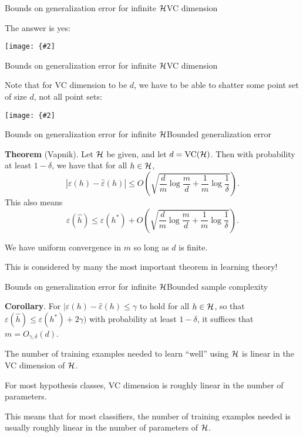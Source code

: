 \documentclass{beamer}
\newcommand{\myfig}[3]{\centerline{\texttt{[image: \{\#2]}}}
    \centerline{\scriptsize #3}}
\begin{document}
\begin{frame}{Bounds on generalization error for infinite $\cal H$}{VC dimension}

  The answer is yes:

  \medskip
  
  \myfig{4.5in}{shattering}{Ng (2017), CS229 lecture notes.}

\end{frame}


\begin{frame}{Bounds on generalization error for infinite $\cal H$}{VC dimension}

  Note that for VC dimension to be $d$, we have to be able to shatter
  \alert{some} point set of size $d$, \alert{not all} point sets:

  \medskip
 
  \myfig{3in}{unshatterable-points}{Ng (2017), CS229 lecture notes.}
  
\end{frame}


\begin{frame}{Bounds on generalization error for infinite $\cal H$}{Bounded generalization error}

  \textbf{Theorem} (Vapnik). Let $\cal H$ be given, and let $d =
  \text{VC}({\cal H})$. Then with probability at least $1-\delta$, we
  have that for all $h \in \cal H$,
  \[ |\varepsilon(h)-\hat{\varepsilon}(h)| \le O\left( \sqrt{\frac{d}{m}\log\frac{m}{d}+\frac{1}{m}\log\frac{1}{\delta}} \right) .\]
  This also means
  \[ \varepsilon(\hat{h}) \le \varepsilon(h^*) + O\left( \sqrt{\frac{d}{m}\log\frac{m}{d}+\frac{1}{m}\log\frac{1}{\delta}} \right) .\]

  We have uniform convergence in $m$ so long as $d$ is finite.

  \medskip

  This is considered by many \alert{the most important theorem} in
  learning theory!
  
\end{frame}


\begin{frame}{Bounds on generalization error for infinite $\cal H$}{Bounded sample complexity}

  \textbf{Corollary}. For $|\varepsilon(h)-\hat{\varepsilon}(h) \le
  \gamma$ to hold for all $h \in \cal H$, so that
  $\varepsilon(\hat{h}) \le \varepsilon(h^*) + 2\gamma)$ with
  probability at least $1-\delta$, it suffices that $m =
  O_{\gamma,\delta}(d)$.

  \medskip

  The number of training examples needed to learn ``well'' using $\cal
  H$ is linear in the VC dimension of $\cal H$.

  \medskip

  For most hypothesis classes, VC dimension is roughly linear in the
  number of parameters.

  \medskip

  This means that for most classifiers, the number of training examples
  needed is usually roughly linear in the number of parameters of $\cal H$.

\end{frame}
\end{document}
